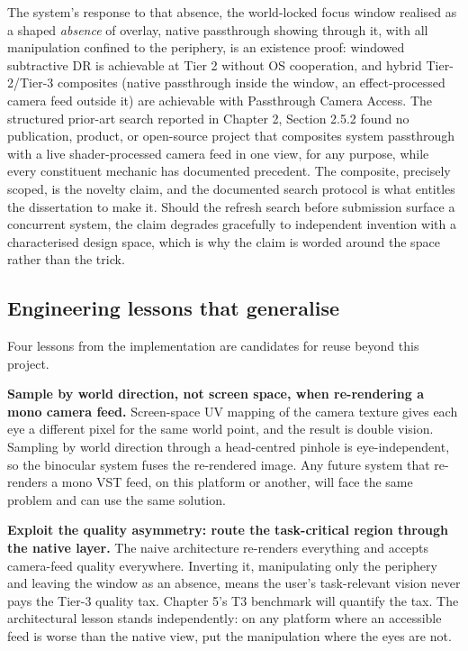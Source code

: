 The system's response to that absence, the world-locked focus window realised as a shaped \textit{absence}
of overlay, native passthrough showing through it, with all manipulation confined to the periphery,
is an existence proof: windowed subtractive DR is achievable at Tier 2 without OS cooperation, and
hybrid Tier-2/Tier-3 composites (native passthrough inside the window, an effect-processed camera
feed outside it) are achievable with Passthrough Camera Access. The structured prior-art search
reported in Chapter 2, Section 2.5.2 found no publication, product, or open-source project
that composites system passthrough with a live shader-processed camera feed in one view, for any
purpose, while every constituent mechanic has documented precedent. The composite, precisely scoped,
is the novelty claim, and the documented search protocol is what entitles the dissertation to make
it. Should the refresh search before submission surface a concurrent system, the claim degrades
gracefully to independent invention with a characterised design space, which is why the claim is
worded around the space rather than the trick.

\subsection{Engineering lessons that generalise}

Four lessons from the implementation are candidates for reuse beyond this project.

\textbf{Sample by world direction, not screen space, when re-rendering a mono camera feed.}
Screen-space UV mapping of the camera texture gives each eye a different pixel for the same world
point, and the result is double vision. Sampling by world direction through a head-centred pinhole
is eye-independent, so the binocular system fuses the re-rendered image. Any future system that
re-renders a mono VST feed, on this platform or another, will face the same problem and can use
the same solution.

\textbf{Exploit the quality asymmetry: route the task-critical region through the native layer.} The
naive architecture re-renders everything and accepts camera-feed quality everywhere. Inverting it,
manipulating only the periphery and leaving the window as an absence, means the user's
task-relevant vision never pays the Tier-3 quality tax. Chapter 5's T3 benchmark will quantify the
tax. The architectural lesson stands independently: on any platform where an accessible feed is
worse than the native view, put the manipulation where the eyes are not.

